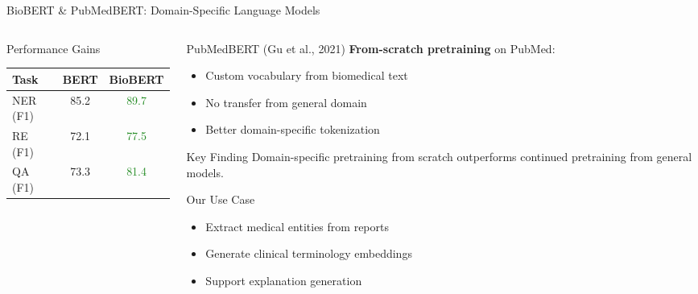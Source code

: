 \documentclass[aspectratio=169]{beamer}
\begin{document}
\begin{frame}{BioBERT \& PubMedBERT: Domain-Specific Language Models}
\begin{columns}
\begin{column}{0.5\textwidth}
            \begin{block}{Performance Gains}
                \begin{center}
                    \begin{tabular}{lcc}
                        \toprule
                        \textbf{Task} & \textbf{BERT} & \textbf{BioBERT} \\
                        \midrule
                        NER (F1) & 85.2 & \textcolor{ForestGreen}{89.7} \\
                        RE (F1) & 72.1 & \textcolor{ForestGreen}{77.5} \\
                        QA (F1) & 73.3 & \textcolor{ForestGreen}{81.4} \\
                        \bottomrule
                    \end{tabular}
                \end{center}
            \end{block}
        \end{column}
        \begin{column}{0.5\textwidth}
            \begin{block}{PubMedBERT (Gu et al., 2021)}
                \textbf{From-scratch pretraining} on PubMed:
                \begin{itemize}
                    \item Custom vocabulary from biomedical text
                    \item No transfer from general domain
                    \item Better domain-specific tokenization
                \end{itemize}
            \end{block}
            
            \begin{alertblock}{Key Finding}
                Domain-specific pretraining from scratch outperforms continued pretraining from general models.
            \end{alertblock}
            
            \begin{block}{Our Use Case}
                \begin{itemize}
                    \item Extract medical entities from reports
                    \item Generate clinical terminology embeddings
                    \item Support explanation generation
                \end{itemize}
            \end{block}
        \end{column}
    \end{columns}
\end{frame}
\end{document}
